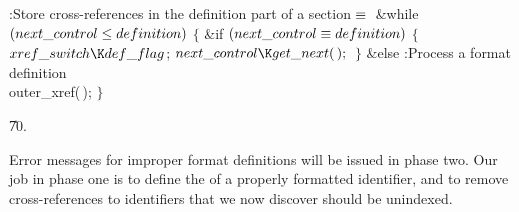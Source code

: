 \Y\B\4:Store cross-references in the definition part of a section\X${}\equiv{}$%
\6
\&{while} ${}(\\{next\_control}\le\\{definition}){}$\5
${}\{{}$\1\6
\&{if} ${}(\\{next\_control}\equiv\\{definition}){}$\5
${}\{{}$\1\6
${}\\{xref\_switch}\K\\{def\_flag}{}$;\6
${}\\{next\_control}\K\\{get\_next}(\,);{}$\6
\4${}\}{}$\2\6
\&{else}\1\5
:Process a format definition\X\2\6
\\{outer\_xref}(\,);\6
\4${}\}{}$\2\par
\U70.\fi

Error messages for improper format definitions will be issued in phase
two. Our job in phase one is to define the  of a properly formatted
identifier, and to remove cross-references to identifiers that we now
discover should be unindexed.


